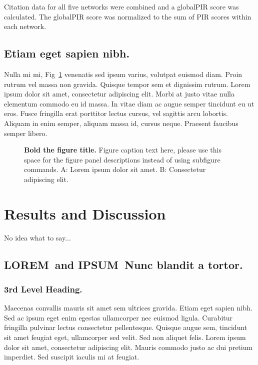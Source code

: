 \documentclass[10pt,letterpaper]{article}
\newcommand{\lorem}{{\bf LOREM}}
\newcommand{\ipsum}{{\bf IPSUM}}
\begin{document}
Citation data for all five networks were combined and a globalPIR score was calculated. The globalPIR score was normalized to the sum of PIR scores within each network.  


\subsection*{Etiam eget sapien nibh.}

Nulla mi mi, Fig~\ref{fig1} venenatis sed ipsum varius, volutpat euismod diam. Proin rutrum vel massa non gravida. Quisque tempor sem et dignissim rutrum. Lorem ipsum dolor sit amet, consectetur adipiscing elit. Morbi at justo vitae nulla elementum commodo eu id massa. In vitae diam ac augue semper tincidunt eu ut eros. Fusce fringilla erat porttitor lectus cursus,  vel sagittis arcu lobortis. Aliquam in enim semper, aliquam massa id, cursus neque. Praesent faucibus semper libero.

\begin{figure}[!h]
\caption{{\bf Bold the figure title.}
Figure caption text here, please use this space for the figure panel descriptions instead of using subfigure commands. A: Lorem ipsum dolor sit amet. B: Consectetur adipiscing elit.}
\label{fig1}
\end{figure}

\section*{Results and Discussion}

No idea what to say...

\subsection*{\lorem\ and \ipsum\ Nunc blandit a tortor.}
\subsubsection*{3rd Level Heading.} 

Maecenas convallis mauris sit amet sem ultrices gravida. Etiam eget sapien nibh. Sed ac ipsum eget enim egestas ullamcorper nec euismod ligula. Curabitur fringilla pulvinar lectus consectetur pellentesque. Quisque augue sem, tincidunt sit amet feugiat eget, ullamcorper sed velit. Sed non aliquet felis. Lorem ipsum dolor sit amet, consectetur adipiscing elit. Mauris commodo justo ac dui pretium imperdiet. Sed suscipit iaculis mi at feugiat. 
\end{document}
